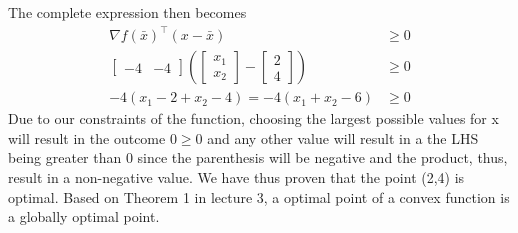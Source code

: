 \documentclass{article}
\begin{document}
	The complete expression then becomes 
	\begin{align}
		\nabla f(\bar{x})^\top (x -\bar{x}) &\geq 0 \\
			\begin{bmatrix}
			-4 &
			-4
		\end{bmatrix}
		\left(\begin{bmatrix}
			x_1 \\ x_2
		\end{bmatrix} -
		\begin{bmatrix}
			2 \\ 4
		\end{bmatrix}\right)
		& \geq 0 \\
		-4(x_1 - 2 + x_2 -4) = -4(x_1 + x_2 -6) & \geq 0
	\end{align}
	Due to our constraints of the function, choosing the largest possible values for x will result in the outcome $0\geq 0$ and any other value will result in a the LHS being greater than 0 since the parenthesis will be negative and the product, thus, result in a non-negative value. We have thus proven that the point (2,4) is optimal. Based on Theorem 1 in lecture 3, a optimal point of a convex function is a globally optimal point.
\end{document}

